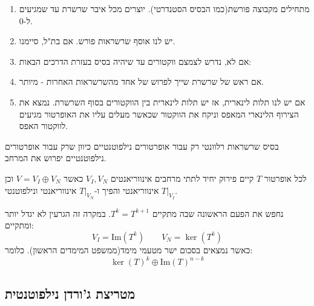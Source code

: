 \documentclass{tstextbook}
\begin{document}
\begin{proposition}
  \begin{enumerate}
    \item מתחילים מקבוצה פורשת(כמו הבסיס הסטנדרטי). יוצרים מכל איבר שרשרת עד שמגיעים ל-0. 


    \item יש לנו אוסף שרשראות פורש. אם בת"ל, סיימנו. 


    \item אם לא, נדרש לצמצם ווקטורים עד שיהיה בסיס בעזרת הדרכים הבאות: 


    \item אם ראש של שרשרת שייך לפרוש של אחד מהשרשראות האחרות - מיותר. 


    \item אם יש לנו תלות לינארית, אז יש תלות לינארית בין הווקטורים בסוף השרשרת. נמצא את הצירוף הלינארי המאפס וניקח את הווקטור שכאשר מעלים עליו את האופרטור מגיעים לווקטור האפס. 


  \end{enumerate}
\end{proposition}
\begin{remark}
בסיס שרשראות רלוונטי רק עבור אופרטורים נילפוטנטיים כיוון שרק עבור אופרטורים נילפוטנטיים יפרוש את המרחב.

\end{remark}
\begin{proposition}
לכל אופרטור \(T\) קיים פירוק יחיד לתתי מרחבים אינווריאנטים \(V_{I},V_{N}\) כאשר \(V=V_{I}\oplus V_{N}\) וכן \(T|_{V_{I}}\) אינווריאנטי והפיך ו-\(T|_{V_{N}}\) אינווריאנטי ונילפוטנטי. 

\end{proposition}
\begin{proposition}
נחפש את הפעם הראשונה שבה מתקיים \(T^{k}=T^{k+1}\). במקרה זה הגרעין לא יגדל יותר ומתקיים:
$$V_{I}=\mathrm{Im}(T^{k})\qquad  V_{N}=\ker (T^{k})$$
כאשר נמצאים בסכום ישר מטעמי מימד(ממשפט המימדים הראשון). כלומר:
$$\ker \left( T \right)^{k}\oplus \mathrm{Im}\left( T\right)^{n-k}$$

\end{proposition}
\subsection{מטריצת ג'ורדן נילפוטנטית}
\end{document}
